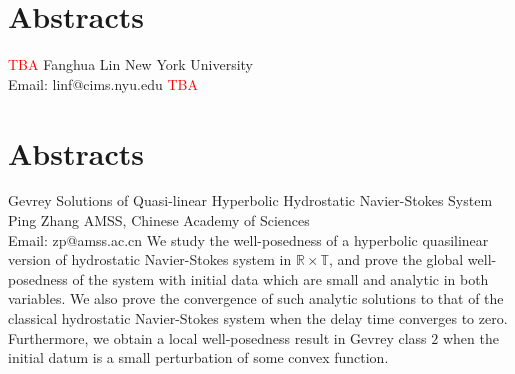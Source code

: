 \documentclass[
	openany, %
	parskip=full, %
	12pt, %
	a4paper, %
]{conferencebooklet} %
\begin{document}





\chapter{Abstracts}

\abstract
    {\textcolor{red}{TBA}}
    {Fanghua  Lin}
    {}
    {New York University\\
    Email: linf@cims.nyu.edu}
    {\textcolor{red}{TBA}}

\chapter*{Abstracts}
\abstract
    {Gevrey Solutions of Quasi-linear Hyperbolic Hydrostatic Navier-Stokes System}
    {Ping Zhang}
    {}
    {AMSS, Chinese Academy of Sciences\\
    Email: zp@amss.ac.cn}
    {We study the well-posedness of  a hyperbolic quasilinear version of hydrostatic  Navier-Stokes system in $\mathbb{R}\times \mathbb{T}$, and  prove the global well-posedness of the system with initial  data which are small and analytic  in both variables. We also prove  the convergence of such analytic solutions to that of the classical hydrostatic Navier-Stokes system when the delay time converges to zero. Furthermore, we obtain a local well-posedness result in Gevrey class $2$ when the initial datum is a small perturbation of some convex function.}
\end{document}
